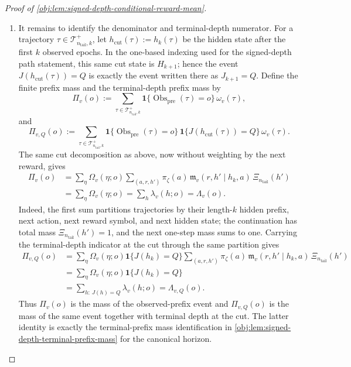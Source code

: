 \documentclass[11pt]{article}
\begin{document}
\begin{proof}[Proof of \cref{obj:lem:signed-depth-conditional-reward-mean}]
\begin{enumerate}
\item
It remains to identify the denominator and terminal-depth numerator. For a trajectory \(\tau\in\mathcal T^+_{n_{\mathrm{tail}},k}\), let \(h_{\mathrm{cut}}(\tau):=h_k(\tau)\) be the hidden state after the first \(k\) observed epochs. In the one-based indexing used for the signed-depth path statement, this same cut state is \(H_{k+1}\); hence the event \(J(h_{\mathrm{cut}}(\tau))=Q\) is exactly the event written there as \(J_{k+1}=Q\). Define the finite prefix mass and the terminal-depth prefix mass by
\[
\Pi_v(o)
:=
\sum_{\tau\in\mathcal T^+_{n_{\mathrm{tail}},k}}
\mathbf 1\{\operatorname{Obs}_{\mathrm{pre}}(\tau)=o\}\,\omega_v(\tau),
\]
and
\[
\Pi_{v,Q}(o)
:=
\sum_{\tau\in\mathcal T^+_{n_{\mathrm{tail}},k}}
\mathbf 1\{\operatorname{Obs}_{\mathrm{pre}}(\tau)=o\}\,
\mathbf 1\{J(h_{\mathrm{cut}}(\tau))=Q\}\,\omega_v(\tau).
\]
The same cut decomposition as above, now without weighting by the next reward, gives
\[
\begin{aligned}
\Pi_v(o)
&=
\sum_{\eta}\Omega_v(\eta;o)
\sum_{(a,r,h')}\pi_\zeta(a)\,
\mathfrak m_v(r,h'\mid h_k,a)\,\Xi_{n_{\mathrm{tail}}}(h') \\
&=
\sum_{\eta}\Omega_v(\eta;o)
=
\sum_h\lambda_v(h;o)
=
\Lambda_v(o).
\end{aligned}
\]
Indeed, the first sum partitions trajectories by their length-\(k\) hidden prefix, next action, next reward symbol, and next hidden state; the continuation has total mass \(\Xi_{n_{\mathrm{tail}}}(h')=1\), and the next one-step mass sums to one. Carrying the terminal-depth indicator at the cut through the same partition gives
\[
\begin{aligned}
\Pi_{v,Q}(o)
&=
\sum_{\eta}\Omega_v(\eta;o)\mathbf 1\{J(h_k)=Q\}
\sum_{(a,r,h')}\pi_\zeta(a)\,
\mathfrak m_v(r,h'\mid h_k,a)\,\Xi_{n_{\mathrm{tail}}}(h') \\
&=
\sum_{\eta}\Omega_v(\eta;o)\mathbf 1\{J(h_k)=Q\} \\
&=
\sum_{h:\,J(h)=Q}\lambda_v(h;o)
=
\Lambda_{v,Q}(o).
\end{aligned}
\]
Thus \(\Pi_v(o)\) is the mass of the observed-prefix event and \(\Pi_{v,Q}(o)\) is the mass of the same event together with terminal depth at the cut. The latter identity is exactly the terminal-prefix mass identification in \cref{obj:lem:signed-depth-terminal-prefix-mass} for the canonical horizon.


\end{enumerate}
\end{proof}
\end{document}
